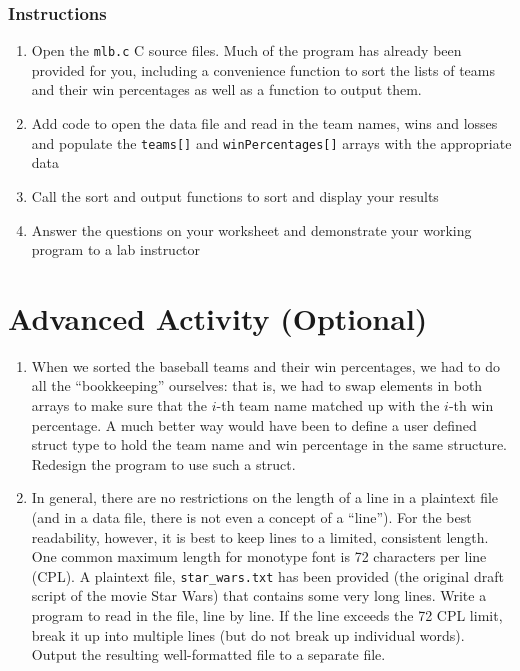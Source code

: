 \documentclass[12pt]{scrartcl}
\begin{document}
\subsubsection*{Instructions}

\begin{enumerate}
  \item Open the \texttt{mlb.c} C source files.  Much of the program 
  	has already been provided for you, including a convenience function to 
	sort the lists of teams and their win percentages as well as a function 
	to output them.
  \item Add code to open the data file and read in the team names, wins and 
	losses and populate the \texttt{teams[]} and \texttt{winPercentages[]} 
	arrays with the appropriate data
  \item Call the sort and output functions to sort and display your results
  \item Answer the questions on your worksheet and demonstrate your working 
  	program to a lab instructor
\end{enumerate}

\section{Advanced Activity (Optional)}

\begin{enumerate}
  \item When we sorted the baseball teams and their win percentages, we had 
  	to do all the ``bookkeeping'' ourselves: that is, we had to swap elements 
	in both arrays to make sure that the $i$-th team name matched up with the 
	$i$-th win percentage.  A much better way would have been to define a 
	user defined struct type to hold the team name and win percentage in 
	the same structure.  Redesign the program to use such a struct.
  \item In general, there are no restrictions on the length of a line in a plaintext 
	file (and in a data file, there is not even a concept of a ``line'').  For the best 
	readability, however, it is best to keep lines to a limited, consistent length.  
	One common maximum length for monotype font is 72 characters per 
	line (CPL).  A plaintext file, \texttt{star_wars.txt} has been provided (the 
	original draft script of the movie Star Wars) that contains some very long 
	lines.  Write a program to read in the file, line by line.  If the line exceeds 
	the 72 CPL limit, break it up into multiple lines (but do not break up individual 
	words).  Output the resulting well-formatted file to a separate file.
\end{enumerate}
\end{document}
